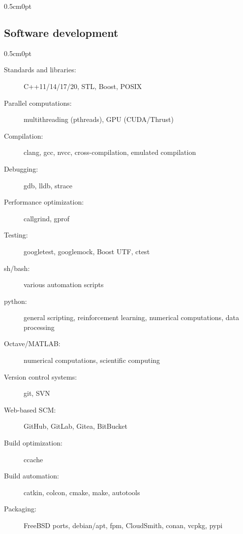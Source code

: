 \documentclass[a4paper,10pt]{report}
\newenvironment{cvindent}{\begin{adjustwidth}{0.5cm}{0pt}}{\end{adjustwidth}}
\newenvironment{cvdescription}[1][]{\begin{cvindent}\begin{description}[#1]}{\end{description}\end{cvindent}}
\begin{document}
\begin{cvindent}
\subsection{Software development}

\begin{cvdescription}
    \item[C++] \leavevmode
        \begin{description}
            \item[Standards and libraries:]  C++11/14/17/20, STL, Boost, POSIX
            \item[Parallel computations:]    multithreading (pthreads), GPU (CUDA/Thrust)
            \item[Compilation:]              clang, gcc, nvcc, cross-compilation, emulated compilation
            \item[Debugging:]                gdb, lldb, strace
            \item[Performance optimization:] callgrind, gprof
            \item[Testing:]                  googletest, googlemock, Boost UTF, ctest
        \end{description}

    \item[Other languages] \leavevmode
        \begin{description}
            \item[sh/bash:]       various automation scripts
            \item[python:]        general scripting, reinforcement learning, numerical computations, data processing
            \item[Octave/MATLAB:] numerical computations, scientific computing
        \end{description}

    \item[Source code, build, packaging] \leavevmode
        \begin{description}
            \item[Version control systems:] git, SVN
            \item[Web-based SCM:]           GitHub, GitLab, Gitea, BitBucket
            \item[Build optimization:]      ccache
            \item[Build automation:]        catkin, colcon, cmake, make, autotools
            \item[Packaging:]               FreeBSD ports, debian/apt, fpm, CloudSmith, conan, vcpkg, pypi
        \end{description}


\end{cvdescription}
\end{cvindent}
\end{document}
